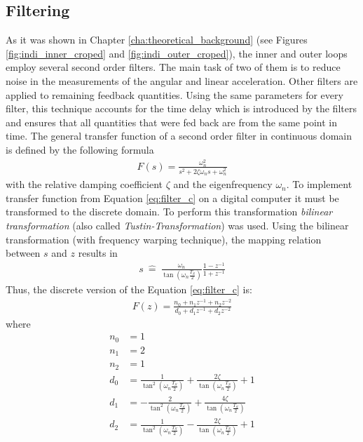\documentclass[11pt, a4paper, twoside]{report}
\begin{document}
\subsection{Filtering} \label{subsec:filtering}

As it was shown in Chapter \ref{cha:theoretical_background} (see Figures \ref{fig:indi_inner_croped} and \ref{fig:indi_outer_croped}), the inner and outer loops employ several second order filters. The main task of two of them is to reduce  noise in the measurements of the angular and linear acceleration. Other filters are applied to remaining feedback quantities. Using the same parameters for every filter, this technique accounts for the time delay which is introduced by the filters and ensures that all quantities that were fed back are from the same point in time. The general transfer function of a second order filter in continuous domain is defined by the following formula
\begin{equation}
	\begin{split}
		F(s) = \frac{\omega_n^2}{s^2+2\zeta\omega_ns+\omega_n^2}
		\label{eq:filter_c}
	\end{split}
\end{equation}
with the relative damping coefficient $\zeta$ and the eigenfrequency $\omega_n$. To implement transfer function from Equation \ref{eq:filter_c} on a digital computer it must be transformed to the discrete domain. To perform this transformation \textit{bilinear transformation} (also called \textit{Tustin-Transformation}) was used. Using the bilinear transformation (with frequency warping technique), the mapping relation between $s$ and $z$ results in
\begin{equation}
	\begin{split}
		s \ \widehat{=} \ \frac{\omega_n}{\tan(\omega_n\frac{T_S}{2})} \frac{1-z^{-1}}{1+z^{-1}}
		\label{eq:filter_c}
	\end{split}
\end{equation}
Thus, the discrete version of the Equation \ref{eq:filter_c} is:
\begin{equation}
	\begin{split}
		F(z) = \frac{n_0 + n_1z^{-1} + n_2z^{-2}}{d_0 + d_1z^{-1} + d_2z^{-2}}
		\label{eq:filter_d}
	\end{split}
\end{equation}
where 
\begin{subequations}
	\begin{align}
		n_0 &= 1 \\
		n_1 &= 2\\
		n_2 &= 1 \\
		d_0 &= \frac{1}{\tan^2(\omega_n\frac{T_S}{2})} + \frac{2\zeta}{\tan(\omega_n\frac{T_S}{2})} + 1 \\
		d_1 &= -\frac{2}{\tan^2(\omega_n\frac{T_S}{2})} + \frac{4\zeta}{\tan(\omega_n\frac{T_S}{2})} \\
		d_2 &= \frac{1}{\tan^2(\omega_n\frac{T_S}{2})} - \frac{2\zeta}{\tan(\omega_n\frac{T_S}{2})} + 1
	\end{align}
	\label{eq:filter_parameters}
\end{subequations}
\end{document}
